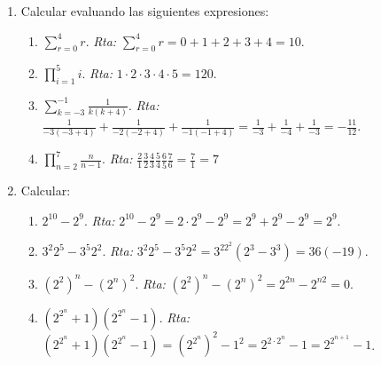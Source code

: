 \documentclass[a4paper,12pt,twoside,spanish,reqno]{amsbook}
\numberwithin{equation}{section}
\newcommand{\rta}{\noindent\textit{Rta: }}
\begin{document}
\begin{enumerate}
\begin{enumerate}
            
            
            
            \item Probar que si $a+c <b+c$ entonces $a<b$.
            
            \rta Por  axioma I10 $a+c -c  <b+c -c$. Por axiomas I6 e I4 obtenemos $a<b$.
        \end{enumerate}
        
    

        
        
        
        
        \item Calcular evaluando las siguientes expresiones:
            \begin{enumerate}
                \item $\displaystyle{\sum_{r=0}^4 r}$. \quad \rta $\displaystyle{\sum_{r=0}^4 r} = 0+1+2+3+4 = 10.$
                \item \quad $\displaystyle{\prod_{i=1}^5 i}$. \quad \rta $1 \cdot  2 \cdot 3 \cdot 4\cdot  5 = 120$. 
                \item  \quad $\displaystyle{\sum_{k=-3}^{-1} \frac{1}{k(k+4)}}$. \quad \rta  $\frac{1}{-3(-3+4)} +\frac{1}{-2(-2+4)} +\frac{1}{-1(-1+4)} = \frac{1}{-3} +\frac{1}{-4} +\frac{1}{-3} = -\frac{11}{12}$.
                \item \quad $\displaystyle{\prod_{n=2}^7 \frac{n}{n-1}}$. \quad \rta $\displaystyle{\frac{2}{1}\frac{3}{2}\frac{4}{3}\frac{5}{4}\frac{6}{5}\frac{7}{6} = \frac{7}{1} = 7}$
            \end{enumerate}
        
        
        
        
        
        
        \item Calcular:
            \begin{enumerate}
                \item \quad $2^{10} - 2^{9}$. \quad  \rta $2^{10} - 2^{9} = 2\cdot 2^{9} - 2^{9} = 2^{9} + 2^{9} -2^{9} = 2^{9}$.
                \item \quad $3^2 2^5 - 3^5 2^2$. \quad  \rta $3^2 2^5 - 3^5 2^2 = 3^22^2(2^3 -3^3) = 36 (-19)$.
                \item \quad $(2^2)^n - (2^n)^2$. \quad  \rta $(2^2)^n - (2^n)^2 = 2^{2n} - 2^{n2} =0$.
                \item \quad $(2^{2^n} + 1)  (2^{2^n} - 1)$. \quad  \rta $(2^{2^n} + 1)  (2^{2^n} - 1) = {(2^{2^n})}^2 -1^2 = 2^{2 \cdot 2^n} - 1 = 2^{2^{n+1}} - 1$.
            \end{enumerate}
        

\end{enumerate}
\end{document}
